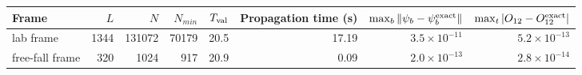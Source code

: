 \begin{tabular}{lrrrrrrr}
\hline
Frame & $L$ & $N$ & $N_{min}$ & $T_{\rm val}$ & Propagation time (s) & $\max_b\|\psi_b-\psi_b^{\rm exact}\|$ & $\max_t|O_{12}-O_{12}^{\rm exact}|$ \\
\hline
lab frame & 1344 & 131072 & 70179 & 20.5 & 17.19 & $3.5\times10^{-11}$ & $5.2\times10^{-13}$ \\
free-fall frame & 320 & 1024 & 917 & 20.9 & 0.09 & $2.0\times10^{-13}$ & $2.8\times10^{-14}$ \\
\hline
\end{tabular}
